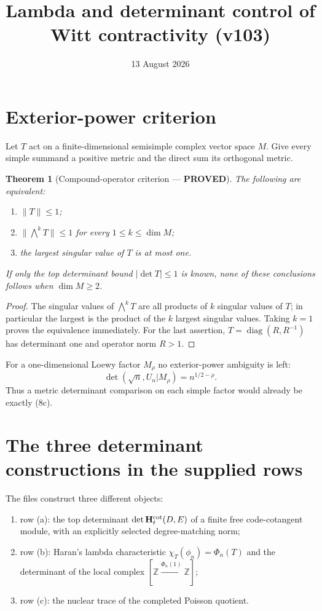 \documentclass[11pt]{article}
\title{Lambda and determinant control of Witt contractivity (v103)}
\date{13 August 2026}
\newcommand{\PROVED}{\textcolor{green!40!black}{\textbf{PROVED}}}
\newtheorem{theorem}{Theorem}
\begin{document}
\maketitle

\section{Exterior-power criterion}

Let $T$ act on a finite-dimensional semisimple complex vector space $M$.
Give every simple summand a positive metric and the direct sum its
orthogonal metric.

\begin{theorem}[Compound-operator criterion --- \PROVED]
The following are equivalent:
\begin{enumerate}
\item $\|T\|\le1$;
\item $\|\bigwedge^kT\|\le1$ for every $1\le k\le\dim M$;
\item the largest singular value of $T$ is at most one.
\end{enumerate}
If only the top determinant bound
$|\det T|\le1$ is known, none of these conclusions follows when
$\dim M\ge2$.
\end{theorem}

\begin{proof}
The singular values of $\bigwedge^kT$ are all products of $k$ singular
values of $T$; in particular the largest is the product of the $k$ largest
singular values.  Taking $k=1$ proves the equivalence immediately.  For the
last assertion, $T=\operatorname{diag}(R,R^{-1})$ has determinant one and
operator norm $R>1$.
\end{proof}

For a one-dimensional Loewy factor $M_\rho$ no exterior-power ambiguity is
left:
\begin{equation}
 \det(\sqrt n,U_n|M_\rho)=n^{1/2-\rho}.             \tag{1}
\end{equation}
Thus a metric determinant comparison on each simple factor would already
be exactly (8c).

\section{The three determinant constructions in the supplied rows}

The files construct three different objects:
\begin{enumerate}
\item row (a): the top determinant
$\det\mathbf H_t^{\rm cot}(D,E)$ of a finite free code-cotangent module,
with an explicitly selected degree-matching norm;
\item row (b): Haran's lambda characteristic
$\chi_T(\phi_n)=\Phi_n(T)$ and the determinant of the local complex
$[\mathbb Z\xrightarrow{\Phi_n(1)}\mathbb Z]$;
\item row (c): the nuclear trace of the completed Poisson quotient.
\end{enumerate}
\end{document}
